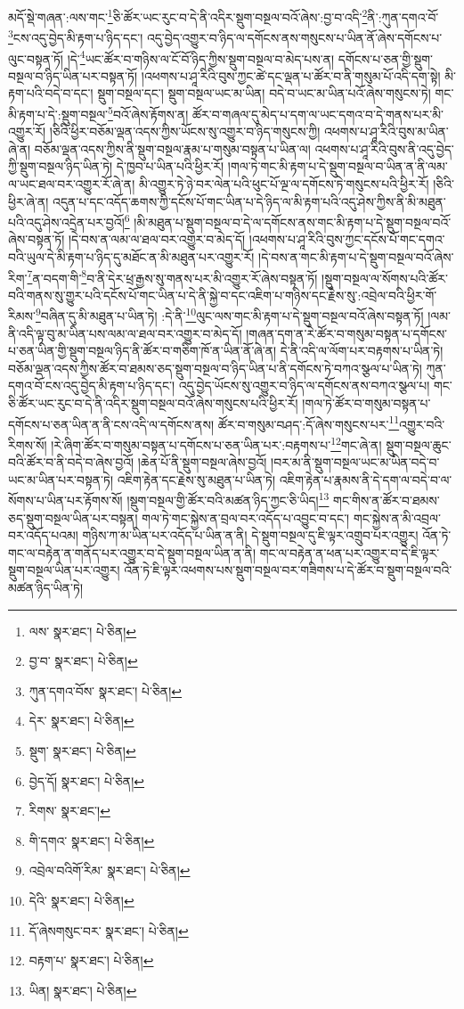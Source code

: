 མདོ་སྡེ་གཞན་:ལས་གང་\footnote{ལས་  སྣར་ཐང་།  པེ་ཅིན། }ཅི་ཚོར་ཡང་རུང་བ་དེ་ནི་འདིར་སྡུག་བསྔལ་བའོ་ཞེས་:བྱ་བ་འདི་\footnote{བྱ་བ་  སྣར་ཐང་།  པེ་ཅིན། }ནི་:ཀུན་དགའ་བོ་\footnote{ཀུན་དགའ་བོས་  སྣར་ཐང་།  པེ་ཅིན། }ངས་འདུ་བྱེད་མི་རྟག་པ་ཉིད་དང་། འདུ་བྱེད་འགྱུར་བ་ཉིད་ལ་དགོངས་ནས་གསུངས་པ་ཡིན་ནོ་ཞེས་དགོངས་པ་ལུང་བསྟན་ཏོ། །དེ་\footnote{དེར་  སྣར་ཐང་།  པེ་ཅིན། }ཡང་ཚོར་བ་གཉིས་ལ་ངོ་བོ་ཉིད་ཀྱིས་སྡུག་བསྔལ་བ་མེད་པས་ན། དགོངས་པ་ཅན་གྱི་སྡུག་བསྔལ་བ་ཉིད་ཡིན་པར་བསྟན་ཏོ། །འཕགས་པ་ཤཱ་རིའི་བུས་ཀྱང་ཚེ་དང་ལྡན་པ་ཚོར་བ་ནི་གསུམ་པོ་འདི་དག་སྟེ། མི་རྟག་པའི་བདེ་བ་དང་། སྡུག་བསྔལ་དང་། སྡུག་བསྔལ་ཡང་མ་ཡིན། བདེ་བ་ཡང་མ་ཡིན་པའོ་ཞེས་གསུངས་ཏེ། གང་མི་རྟག་པ་དེ་:སྡུག་བསྔལ་\footnote{སྡུག་  སྣར་ཐང་།  པེ་ཅིན། }བའོ་ཞེས་རྟོགས་ན། ཚོར་བ་གཞལ་དུ་མེད་པ་དག་ལ་ཡང་དགའ་བ་དེ་གནས་པར་མི་འགྱུར་རོ། །ཅིའི་ཕྱིར་བཅོམ་ལྡན་འདས་ཀྱིས་ཡོངས་སུ་འགྱུར་བ་ཉིད་གསུངས་ཀྱི། འཕགས་པ་ཤཱ་རིའི་བུས་མ་ཡིན་ཞེ་ན། བཅོམ་ལྡན་འདས་ཀྱིས་ནི་སྡུག་བསྔལ་རྣམ་པ་གསུམ་བསྟན་པ་ཡིན་ལ། འཕགས་པ་ཤཱ་རིའི་བུས་ནི་འདུ་བྱེད་ཀྱི་སྡུག་བསྔལ་ཉིད་ཡིན་ཏེ། དེ་ཁྱབ་པ་ཡིན་པའི་ཕྱིར་རོ། །གལ་ཏེ་གང་མི་རྟག་པ་དེ་སྡུག་བསྔལ་བ་ཡིན་ན་ནི་ལམ་ལ་ཡང་ཐལ་བར་འགྱུར་རོ་ཞེ་ན། མི་འགྱུར་ཏེ་ཉེ་བར་ལེན་པའི་ཕུང་པོ་ལྔ་ལ་དགོངས་ཏེ་གསུངས་པའི་ཕྱིར་རོ། །ཅིའི་ཕྱིར་ཞེ་ན། འདུན་པ་དང་འདོད་ཆགས་ཀྱི་དངོས་པོ་གང་ཡིན་པ་དེ་ཉིད་ལ་མི་རྟག་པའི་འདུ་ཤེས་ཀྱིས་ནི་མི་མཐུན་པའི་འདུ་ཤེས་འདྲེན་པར་བྱའོ།\footnote{བྱེད་དོ།  སྣར་ཐང་།  པེ་ཅིན། } །མི་མཐུན་པ་སྡུག་བསྔལ་བ་དེ་ལ་དགོངས་ནས་གང་མི་རྟག་པ་དེ་སྡུག་བསྔལ་བའོ་ཞེས་བསྟན་ཏོ། །དེ་བས་ན་ལམ་ལ་ཐལ་བར་འགྱུར་བ་མེད་དོ། །འཕགས་པ་ཤཱ་རིའི་བུས་ཀྱང་དངོས་པོ་གང་དགའ་བའི་ཡུལ་དེ་མི་རྟག་པ་ཉིད་དུ་མཐོང་ན་མི་མཐུན་པར་འགྱུར་རོ། །དེ་བས་ན་གང་མི་རྟག་པ་དེ་སྡུག་བསྔལ་བའོ་ཞེས་རིག་\footnote{རིགས་  སྣར་ཐང་། }ན་བདག་གི་\footnote{གི་དགའ་  སྣར་ཐང་།  པེ་ཅིན། }བ་ནི་དེར་ཕྲ་རྒྱས་སུ་གནས་པར་མི་འགྱུར་རོ་ཞེས་བསྟན་ཏོ། །སྡུག་བསྔལ་ལ་སོགས་པའི་ཚོར་བའི་གནས་སུ་གྱུར་པའི་དངོས་པོ་གང་ཡིན་པ་དེ་ནི་སྐྱེ་བ་དང་འཇིག་པ་གཉིས་དང་རྗེས་སུ་:འབྲེལ་བའི་ཕྱིར་གོ་རིམས་\footnote{འབྲེལ་བའིགོ་རིམ་  སྣར་ཐང་།  པེ་ཅིན། }བཞིན་དུ་མི་མཐུན་པ་ཡིན་ཏེ། :དེ་ནི་\footnote{དེའི་  སྣར་ཐང་།  པེ་ཅིན། }ལུང་ལས་གང་མི་རྟག་པ་དེ་སྡུག་བསྔལ་བའོ་ཞེས་བསྟན་ཏོ། །ལམ་ནི་འདི་ལྟ་བུ་མ་ཡིན་པས་ལམ་ལ་ཐལ་བར་འགྱུར་བ་མེད་དོ། །གཞན་དག་ན་རེ་ཚོར་བ་གསུམ་བསྟན་པ་དགོངས་པ་ཅན་ཡིན་གྱི་སྡུག་བསྔལ་ཉིད་ནི་ཚོར་བ་གཅིག་ཁོ་ན་ཡིན་ནོ་ཞེ་ན། དེ་ནི་འདི་ལ་ལོག་པར་བརྟགས་པ་ཡིན་ཏེ། བཅོམ་ལྡན་འདས་ཀྱིས་ཚོར་བ་ཐམས་ཅད་སྡུག་བསྔལ་བ་ཉིད་ཡིན་པ་ནི་དགོངས་ཏེ་བཀའ་སྩལ་པ་ཡིན་ཏེ། ཀུན་དགའ་བོ་ངས་འདུ་བྱེད་མི་རྟག་པ་ཉིད་དང་། འདུ་བྱེད་ཡོངས་སུ་འགྱུར་བ་ཉིད་ལ་དགོངས་ནས་བཀའ་སྩལ་པ། གང་ཅི་ཚོར་ཡང་རུང་བ་དེ་ནི་འདིར་སྡུག་བསྔལ་བའོ་ཞེས་གསུངས་པའི་ཕྱིར་རོ། །གལ་ཏེ་ཚོར་བ་གསུམ་བསྟན་པ་དགོངས་པ་ཅན་ཡིན་ན་ནི་ངས་འདི་ལ་དགོངས་ནས། ཚོར་བ་གསུམ་བཤད་:དོ་ཞེས་གསུངས་པར་\footnote{དོ་ཞེསགསུང་བར་  སྣར་ཐང་།  པེ་ཅིན། }འགྱུར་བའི་རིགས་སོ། །རེ་ཞིག་ཚོར་བ་གསུམ་བསྟན་པ་དགོངས་པ་ཅན་ཡིན་པར་:བརྟགས་པ་\footnote{བརྟག་པ་  སྣར་ཐང་།  པེ་ཅིན། }གང་ཞེ་ན། སྡུག་བསྔལ་ཆུང་བའི་ཚོར་བ་ནི་བདེ་བ་ཞེས་བྱའོ། །ཆེན་པོ་ནི་སྡུག་བསྔལ་ཞེས་བྱའོ། །བར་མ་ནི་སྡུག་བསྔལ་ཡང་མ་ཡིན་བདེ་བ་ཡང་མ་ཡིན་པར་བསྟན་ཏེ། འཇིག་རྟེན་དང་རྗེས་སུ་མཐུན་པ་ཡིན་ཏེ། འཇིག་རྟེན་པ་རྣམས་ནི་དེ་དག་ལ་བདེ་བ་ལ་སོགས་པ་ཡིན་པར་རྟོགས་སོ། །སྡུག་བསྔལ་གྱི་ཚོར་བའི་མཚན་ཉིད་ཀྱང་ཅི་ཡིད།\footnote{ཡིན།  སྣར་ཐང་།  པེ་ཅིན། } གང་གིས་ན་ཚོར་བ་ཐམས་ཅད་སྡུག་བསྔལ་ཡིན་པར་བསྟན། གལ་ཏེ་གང་སྐྱེས་ན་བྲལ་བར་འདོད་པ་འབྱུང་བ་དང་། གང་སྐྱེས་ན་མི་འབྲལ་བར་འདོད་པའམ། གཉིས་ཀ་མ་ཡིན་པར་འདོད་པ་ཡིན་ན་ནི། དེ་སྡུག་བསྔལ་དུ་ཇི་ལྟར་འགྲུབ་པར་འགྱུར། འོན་ཏེ་གང་ལ་བརྟེན་ན་གནོད་པར་འགྱུར་བ་དེ་སྡུག་བསྔལ་ཡིན་ན་ནི། གང་ལ་བརྟེན་ན་ཕན་པར་འགྱུར་བ་དེ་ཇི་ལྟར་སྡུག་བསྔལ་ཡིན་པར་འགྱུར། འོན་ཏེ་ཇི་ལྟར་འཕགས་པས་སྡུག་བསྔལ་བར་གཟིགས་པ་དེ་ཚོར་བ་སྡུག་བསྔལ་བའི་མཚན་ཉིད་ཡིན་ཏེ། 